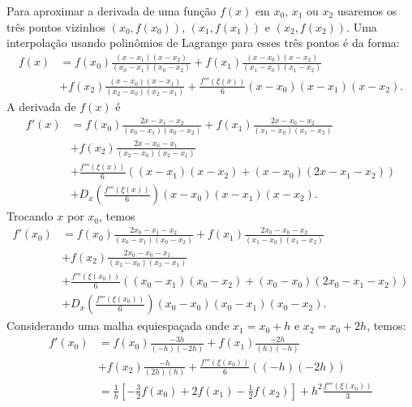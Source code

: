 Para aproximar a derivada de uma função $f(x)$ em $x_0$, $x_1$ ou $x_2$ usaremos os três pontos vizinhos $(x_0,f(x_0))$, $(x_{1},f(x_{1}))$ e $(x_{2},f(x_{2}))$. Uma interpolação usando polinômios de Lagrange para esses três pontos é da forma:
\begin{equation}
  \begin{split}
    f(x) &= f(x_0)\frac{(x-x_{1})(x-x_{2})}{(x_0-x_{1})(x_0-x_{2})}
    +f(x_{1})\frac{(x-x_{0})(x-x_{2})}{(x_{1}-x_{0})(x_{1}-x_{2})}\\
     &+ f(x_{2})\frac{(x-x_{0})(x-x_{1})}{(x_{2}-x_{0})(x_{2}-x_{1})}
    +\frac{f'''(\xi(x))}{6}(x-x_0)(x-x_{1})(x-x_{2}).
  \end{split}
\end{equation}
A derivada de $f(x)$ é
\begin{equation}\label{tres_pontos}
  \begin{split}
    f'(x) &= f(x_0)\frac{2x-x_{1}-x_{2}}{(x_0-x_{1})(x_0-x_{2})}
    +f(x_{1})\frac{2x-x_{0}-x_{2}}{(x_{1}-x_{0})(x_{1}-x_{2})}\\
    &+f(x_{2})\frac{2x-x_{0}-x_{1}}{(x_{2}-x_{0})(x_{2}-x_{1})}\\
    &+\frac{f'''(\xi(x))}{6} \left( (x-x_{1})(x-x_{2}) +(x-x_0)(2x-x_{1}-x_{2})\right)\\
    &+ D_x\left(\frac{f'''(\xi(x))}{6}\right)(x-x_0)(x-x_1)(x-x_2).    
  \end{split}
\end{equation}
Trocando $x$ por $x_0$, temos
\begin{equation}
  \begin{split}
    f'(x_0)&= f(x_0)\frac{2x_0-x_{1}-x_{2}}{(x_0-x_{1})(x_0-x_{2})}
    +f(x_{1})\frac{2x_0-x_{0}-x_{2}}{(x_{1}-x_{0})(x_{1}-x_{2})}\\
    &+f(x_{2})\frac{2x_0-x_{0}-x_{1}}{(x_{2}-x_{0})(x_{2}-x_{1})}\\
    &+ \frac{f'''(\xi(x_0))}{6} \left( (x_0-x_{1})(x_0-x_{2}) +(x_0-x_0)(2x_0-x_{1}-x_{2})\right)\\
    &+ D_x\left(\frac{f'''(\xi(x_0))}{6}\right)(x_0-x_0)(x_0-x_1)(x_0-x_2).
  \end{split}
\end{equation}
Considerando uma malha equiespaçada onde $x_1=x_0+h$ e $x_2=x_0+2h$, temos:
\begin{equation}
  \begin{split}
  f'(x_0)&= f(x_0)\frac{-3h}{(-h)(-2h)} + f(x_{1})\frac{-2h}{(h)(-h)} \\
  &+f(x_{2})\frac{-h}{(2h)(h)}+\frac{f'''(\xi(x_0))}{6} \left( (-h)(-2h)\right)\\
  &= \frac{1}{h}\left[-\frac{3}{2}f(x_0)+2f(x_{1})-\frac{1}{2}f(x_{2})\right]+h^2\frac{f'''(\xi(x_0))}{3}    
  \end{split}
\end{equation}
